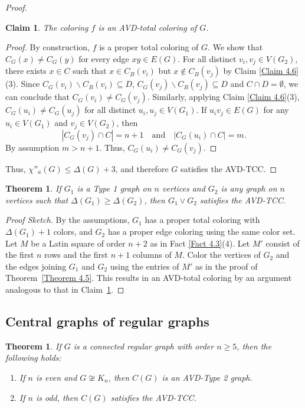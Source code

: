 \documentclass[12pt,reqno,a4paper]{amsart}
\theoremstyle{definition}
\theoremstyle{plain}
\newtheorem{thm}[defn]{Theorem}
\newtheorem{claim}[defn]{Claim}
\begin{document}
\begin{proof}
\begin{claim}\label{Claim 4.7}
The coloring $f$ is an AVD-total coloring of $G$.
\end{claim}

\begin{proof}
By construction, 
$f$ is a proper total coloring of $G$.
We show that $C_{G}(x)\neq C_{G}(y)$ for every edge $xy\in E(G)$. 
For all distinct $v_i, v_j\in V(G_2)$, there exists $x\in C$ such that $x\in C_{B}(v_i)$ but $x\not\in C_{B}(v_j)$ by Claim \ref{Claim 4.6}(3). 
Since $C_{G}(v_i)\backslash C_B(v_i)\subseteq D$, $C_{G}(v_j)\backslash C_{B}(v_j)\subseteq D$ and $C\cap D=\emptyset$, we can conclude that $C_{G}(v_{i})\neq C_{G}(v_{j})$. Similarly, applying Claim \ref{Claim 4.6}(3), $C_{G}(u_{i})\neq C_{G}(u_{j})$ for all distinct $u_i,u_j\in V(G_1)$.
If $u_iv_j\in E(G)$ for any $u_i\in V(G_1)$ and $v_j\in V(G_2)$, then 
\[
|C_G(v_j)\cap C| = n+1
\quad \text{and} \quad
|C_G(u_i)\cap C| = m.
\]
By assumption $m>n+1$. Thus, $C_G(u_i)\neq C_G(v_j)$.
\end{proof}
Thus, $\chi''_a(G) \le \Delta(G)+3$, and therefore $G$ satisfies the AVD-TCC.
\end{proof}


\begin{thm}\label{Theorem 4.8}
If $G_1$ is a Type 1 graph on $n$ vertices and $G_2$ is any graph on $n$ vertices such that $\Delta(G_1)\geq \Delta(G_2)$, then $G_1 \vee G_2$ satisfies the AVD-TCC.
\end{thm}

\begin{proof}[Proof Sketch]
By the assumptions, $G_1$ has a proper total coloring with $\Delta(G_1)+1$ colors, and $G_2$ has a proper edge coloring using the same color set. 
Let $M$ be a Latin square of order $n+2$ as in Fact \ref{Fact 4.3}(4). Let $M'$ consist of the first $n$ rows and the first $n+1$ columns of $M$. Color the vertices of $G_2$ and the edges joining $G_1$ and $G_2$ using the entries of $M'$ as in the proof of Theorem~\ref{Theorem 4.5}. 
This results in an AVD-total coloring by an argument analogous to that in Claim~\ref{Claim 4.7}. 
\end{proof}

\subsection{Central graphs of regular graphs}
\begin{thm}\label{Theorem 4.9}
If $G$ is a connected regular graph with order $n\geq 5$, then the following holds:
\begin{enumerate}
    \item If $n$ is even and $G\not\cong K_n$, then $C(G)$ is an AVD-Type 2 graph. 
    \item If $n$ is odd, then $C(G)$ satisfies the AVD-TCC.  
\end{enumerate}
\end{thm}
\end{document}
